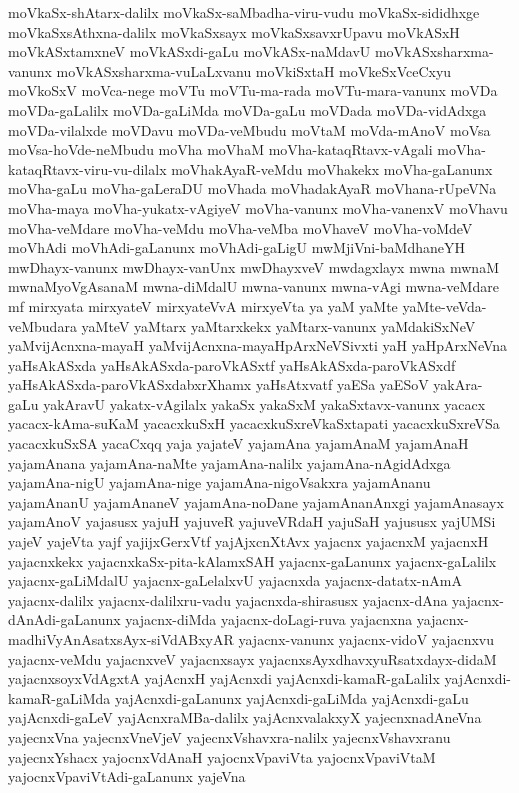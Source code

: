 {moVkaSx-shAtarx-dalilx
moVkaSx-saMbadha-viru-vudu
moVkaSx-sididhxge
moVkaSxsAthxna-dalilx
moVkaSxsayx
moVkaSxsavxrUpavu
moVkASxH
moVkASxtamxneV
moVkASxdi-gaLu
moVkASx-naMdavU
moVkASxsharxma-vanunx
moVkASxsharxma-vuLaLxvanu
moVkiSxtaH
moVkeSxVceCxyu
moVkoSxV
moVca-nege
moVTu
moVTu-ma-rada
moVTu-mara-vanunx
moVDa
moVDa-gaLalilx
moVDa-gaLiMda
moVDa-gaLu
moVDada
moVDa-vidAdxga
moVDa-vilalxde
moVDavu
moVDa-veMbudu
moVtaM
moVda-mAnoV
moVsa
moVsa-hoVde-neMbudu
moVha
moVhaM
moVha-kataqRtavx-vAgali
moVha-kataqRtavx-viru-vu-dilalx
moVhakAyaR-veMdu
moVhakekx
moVha-gaLanunx
moVha-gaLu
moVha-gaLeraDU
moVhada
moVhadakAyaR
moVhana-rUpeVNa
moVha-maya
moVha-yukatx-vAgiyeV
moVha-vanunx
moVha-vanenxV
moVhavu
moVha-veMdare
moVha-veMdu
moVha-veMba
moVhaveV
moVha-voMdeV
moVhAdi
moVhAdi-gaLanunx
moVhAdi-gaLigU
mwMjiVni-baMdhaneYH
mwDhayx-vanunx
mwDhayx-vanUnx
mwDhayxveV
mwdagxlayx
mwna
mwnaM
mwnaMyoVgAsanaM
mwna-diMdalU
mwna-vanunx
mwna-vAgi
mwna-veMdare
mf
mirxyata
mirxyateV
mirxyateVvA
mirxyeVta
ya
yaM
yaMte
yaMte-veVda-veMbudara
yaMteV
yaMtarx
yaMtarxkekx
yaMtarx-vanunx
yaMdakiSxNeV
yaMvijAcnxna-mayaH
yaMvijAcnxna-mayaHpArxNeVSivxti
yaH
yaHpArxNeVna
yaHsAkASxda
yaHsAkASxda-paroVkASxtf
yaHsAkASxda-paroVkASxdf
yaHsAkASxda-paroVkASxdabxrXhamx
yaHsAtxvatf
yaESa
yaESoV
yakAra-gaLu
yakAravU
yakatx-vAgilalx
yakaSx
yakaSxM
yakaSxtavx-vanunx
yacacx
yacacx-kAma-suKaM
yacacxkuSxH
yacacxkuSxreVkaSxtapati
yacacxkuSxreVSa
yacacxkuSxSA
yacaCxqq
yaja
yajateV
yajamAna
yajamAnaM
yajamAnaH
yajamAnana
yajamAna-naMte
yajamAna-nalilx
yajamAna-nAgidAdxga
yajamAna-nigU
yajamAna-nige
yajamAna-nigoVsakxra
yajamAnanu
yajamAnanU
yajamAnaneV
yajamAna-noDane
yajamAnanAnxgi
yajamAnasayx
yajamAnoV
yajasusx
yajuH
yajuveR
yajuveVRdaH
yajuSaH
yajususx
yajUMSi
yajeV
yajeVta
yajf
yajijxGerxVtf
yajAjxcnXtAvx
yajacnx
yajacnxM
yajacnxH
yajacnxkekx
yajacnxkaSx-pita-kAlamxSAH
yajacnx-gaLanunx
yajacnx-gaLalilx
yajacnx-gaLiMdalU
yajacnx-gaLelalxvU
yajacnxda
yajacnx-datatx-nAmA
yajacnx-dalilx
yajacnx-dalilxru-vadu
yajacnxda-shirasusx
yajacnx-dAna
yajacnx-dAnAdi-gaLanunx
yajacnx-diMda
yajacnx-doLagi-ruva
yajacnxna
yajacnx-madhiVyAnAsatxsAyx-siVdABxyAR
yajacnx-vanunx
yajacnx-vidoV
yajacnxvu
yajacnx-veMdu
yajacnxveV
yajacnxsayx
yajacnxsAyxdhavxyuRsatxdayx-didaM
yajacnxsoyxVdAgxtA
yajAcnxH
yajAcnxdi
yajAcnxdi-kamaR-gaLalilx
yajAcnxdi-kamaR-gaLiMda
yajAcnxdi-gaLanunx
yajAcnxdi-gaLiMda
yajAcnxdi-gaLu
yajAcnxdi-gaLeV
yajAcnxraMBa-dalilx
yajAcnxvalakxyX
yajecnxnadAneVna
yajecnxVna
yajecnxVneVjeV
yajecnxVshavxra-nalilx
yajecnxVshavxranu
yajecnxYshacx
yajocnxVdAnaH
yajocnxVpaviVta
yajocnxVpaviVtaM
yajocnxVpaviVtAdi-gaLanunx
yajeVna
}
